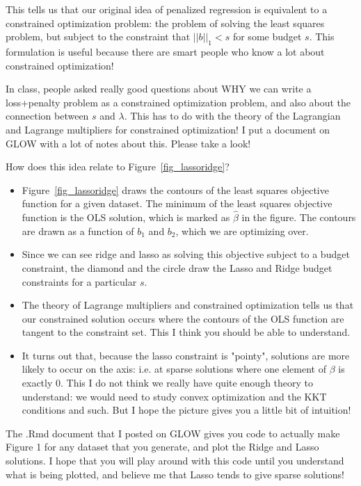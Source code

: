 This tells us that our original idea of penalized regression is equivalent to a constrained optimization problem: the problem of solving the least squares problem, but subject to the constraint that $||b||_1 < s$ for some budget $s$. This formulation is useful because there are smart people who know a lot about constrained optimization!

In class, people asked really good questions about WHY we can write a loss+penalty problem as a constrained optimization problem, and also about the connection between $s$ and $\lambda$. This has to do with the theory of the Lagrangian and Lagrange multipliers for constrained optimization! I put a document on GLOW with a lot of notes about this. Please take a look!

How does this idea relate to Figure~\ref{fig_lassoridge}?
\begin{itemize}
\item Figure~\ref{fig_lassoridge} draws the contours of the least squares objective function for a given dataset. The minimum of the least squares objective function is the OLS solution, which is marked as $\hat{\beta}$ in the figure. The contours are drawn as a function of $b_1$ and $b_2$, which we are optimizing over. 
\item Since we can see ridge and lasso as solving this objective subject to a budget constraint, the diamond and the circle draw the Lasso and Ridge budget constraints for a particular $s$. 
\item The theory of Lagrange multipliers and constrained optimization tells us that our constrained solution occurs where the contours of the OLS function are tangent to the constraint set. This I think you should be able to understand. 
\item It turns out that, because the lasso constraint is "pointy", solutions are more likely to occur on the axis: i.e. at sparse solutions where one element of $\beta$ is exactly $0$. This I do not think we really have quite enough theory to understand: we would need to study convex optimization and the KKT conditions and such. But I hope the picture gives you a little bit of intuition!
\end{itemize}
The .Rmd document that I posted on GLOW gives you code to actually make Figure 1 for any dataset that you generate, and plot the Ridge and Lasso solutions. I hope that you will play around with this code until you understand what is being plotted, and believe me that Lasso tends to give sparse solutions! 


